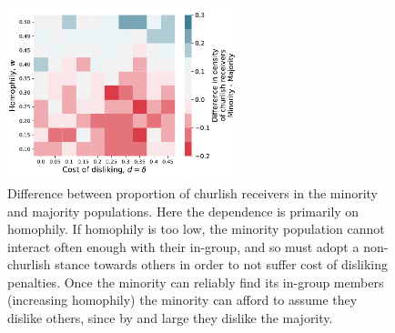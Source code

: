 \documentclass[11pt,letterpaper]{article}
\begin{document}
\begin{figure}[H]
  \centering
    \includegraphics[width=0.6\textwidth]{prelim/Figures/churlish_receivers_diff_005.pdf}
  \caption{Difference between proportion of churlish receivers in the minority 
    and majority populations. Here the dependence is primarily on homophily.
    If homophily is too low, the minority population cannot interact often
    enough with their in-group, and so must adopt a non-churlish stance towards
    others in order to not suffer cost of disliking penalties. Once the minority
    can reliably find its in-group members (increasing homophily) the minority
    can afford to assume they dislike others, since by and large they dislike
    the majority.
  }
  \label{fig:}
\end{figure}





% 


% 
\end{document}
